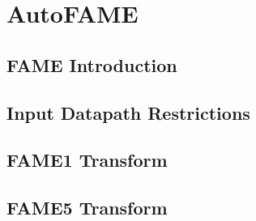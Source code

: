 \section{AutoFAME}
\subsection{FAME Introduction}
\subsection{Input Datapath Restrictions}
\subsection{FAME1 Transform}
\subsection{FAME5 Transform}
